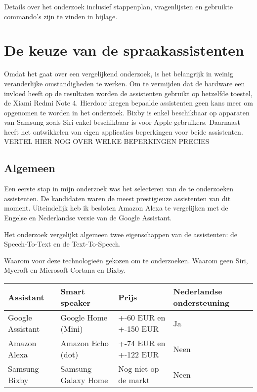 Details over het onderzoek inclusief stappenplan, vragenlijsten en gebruikte commando's zijn te vinden in bijlage.

\section{De keuze van de spraakassistenten}
Omdat het gaat over een vergelijkend onderzoek, is het belangrijk in weinig veranderlijke omstandigheden te werken. Om te vermijden dat de hardware een invloed heeft op de resultaten worden de assistenten gebruikt op hetzelfde toestel, de Xiami Redmi Note 4. Hierdoor kregen bepaalde assistenten geen kans meer om opgenomen te worden in het onderzoek. Bixby is enkel beschikbaar op apparaten van Samsung zoals Siri enkel beschikbaar is voor Apple-gebruikers. Daarnaast heeft het ontwikkelen van eigen applicaties beperkingen voor beide assistenten. VERTEL HIER NOG OVER WELKE BEPERKINGEN PRECIES


\subsection{Algemeen}
\label{sec:algemeen}
Een eerste stap in mijn onderzoek was het selecteren van de te onderzoeken assistenten. De kandidaten waren de meest prestigieuze assistenten van dit moment. Uiteindelijk heb ik besloten Amazon Alexa te vergelijken met de Engelse en Nederlandse versie van de Google Assistant.

Het onderzoek vergelijkt algemeen twee eigenschappen van de assistenten: de Speech-To-Text en de Text-To-Speech. 

Waarom voor deze technologieën gekozen om te onderzoeken. Waarom geen Siri, Mycroft en Microsoft Cortana en Bixby.

\begin{center}
    \begin{tabular}{ | l | l | l | l |}
        \hline
        Assistant & Smart speaker & Prijs & Nederlandse ondersteuning\\ \hline
        Google Assistant & Google Home (Mini) & +-60 EUR en +-150 EUR & Ja \\ \hline
        Amazon Alexa & Amazon Echo (dot) & +-74 EUR en +-122 EUR & Neen \\ \hline
        Samsung Bixby & Samsung Galaxy Home & Nog niet op de markt & Neen\\ \hline
    \end{tabular}
\end{center}

